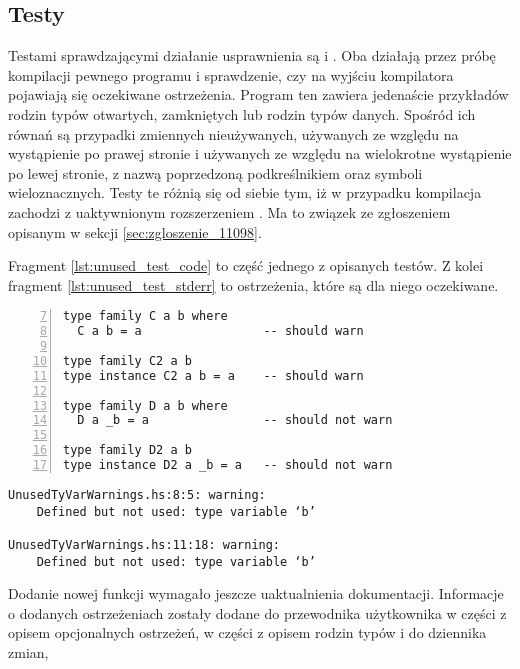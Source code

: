 \subsection{Testy} %

Testami sprawdzającymi działanie usprawnienia są  i
. Oba działają przez próbę kompilacji pewnego
programu i sprawdzenie, czy na wyjściu kompilatora pojawiają się oczekiwane
ostrzeżenia. Program ten zawiera jedenaście przykładów rodzin typów otwartych,
zamkniętych lub rodzin typów danych. Spośród ich równań są przypadki zmiennych
nieużywanych, używanych ze względu na wystąpienie po prawej stronie i używanych
ze względu na wielokrotne wystąpienie po lewej stronie, z nazwą poprzedzoną
podkreślnikiem oraz symboli wieloznacznych. Testy te różnią się od siebie tym,
iż w przypadku  kompilacja zachodzi z
uaktywnionym rozszerzeniem . Ma to związek ze zgłoszeniem
opisanym w sekcji \ref{sec:zgloszenie_11098}.

Fragment \ref{lst:unused_test_code} to część jednego z opisanych testów.
Z kolei fragment \ref{lst:unused_test_stderr} to ostrzeżenia, które są dla niego oczekiwane.
\begin{lstlisting}[float,numbers=left,firstnumber=7,label={lst:unused_test_code},
                   caption={Fragment testu \code{UnusedTyVarWarnings} z równaniami wywołującymi ostrzeżenia lub zawierającymi zmienne poprzedzone podkreślnikiem.}]
type family C a b where
  C a b = a                 -- should warn

type family C2 a b
type instance C2 a b = a    -- should warn

type family D a b where
  D a _b = a                -- should not warn

type family D2 a b
type instance D2 a _b = a   -- should not warn
\end{lstlisting}

\begin{lstlisting}[float,language={},label={lst:unused_test_stderr},
                   caption={Ostrzeżenia generowany przez kompilator dla fragmentu \ref{lst:unused_test_code} po wprowadzeniu zmian.}]
UnusedTyVarWarnings.hs:8:5: warning:
    Defined but not used: type variable ‘b’

UnusedTyVarWarnings.hs:11:18: warning:
    Defined but not used: type variable ‘b’
\end{lstlisting}

Dodanie nowej funkcji wymagało jeszcze uaktualnienia dokumentacji. Informacje o
dodanych ostrzeżeniach zostały dodane do przewodnika użytkownika w części z
opisem opcjonalnych ostrzeżeń, w części z opisem rodzin typów i do dziennika
zmian,


